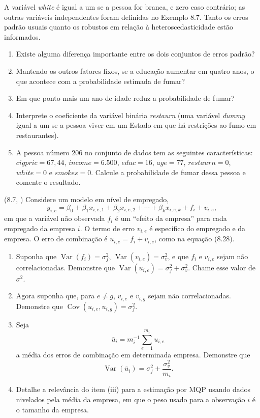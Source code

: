 \documentclass[12pt,letterpaper, onecolumn]{exam}
\begin{document}
\begin{questions}
A variável \textit{white} é igual a um se a pessoa for branca, e zero caso contrário; as outras variáveis independentes foram definidas no Exemplo 8.7. Tanto os erros padrão usuais quanto os robustos em relação à heteroscedasticidade estão informados.

\begin{enumerate}[label=(\roman*)]
    \item Existe alguma diferença importante entre os dois conjuntos de erros padrão?
    \item Mantendo os outros fatores fixos, se a educação aumentar em quatro anos, o que acontece com a probabilidade estimada de fumar?
    \item Em que ponto mais um ano de idade reduz a probabilidade de fumar?
    \item Interprete o coeficiente da variável binária \textit{restaurn} (uma variável \textit{dummy} igual a um se a pessoa viver em um Estado em que há restrições ao fumo em restaurantes).
    \item A pessoa número 206 no conjunto de dados tem as seguintes características: \(cigpric = 67{,}44\), \(income = 6.500\), \(educ = 16\), \(age = 77\), \(restaurn = 0\), \(white = 0\) e \(smokes = 0\). Calcule a probabilidade de fumar dessa pessoa e comente o resultado.
\end{enumerate}

\vspace{0.7cm}

\question (8.7, \citep{wooldridge2016}) Considere um modelo em nível de empregado,
\[
y_{i,e} = \beta_0 + \beta_1 x_{i,e,1} + \beta_2 x_{i,e,2} + \cdots + \beta_k x_{i,e,k} + f_i + v_{i,e},
\]
em que a variável não observada \(f_i\) é um ``efeito da empresa'' para cada empregado da empresa \(i\). O termo de erro \(v_{i,e}\) é específico do empregado e da empresa. O erro de combinação é \(u_{i,e} = f_i + v_{i,e}\), como na equação (8.28).
\begin{enumerate}[label=(\roman*)]
    \item Suponha que \(\operatorname{Var}(f_i)=\sigma_f^2\), \(\operatorname{Var}(v_{i,e})=\sigma_v^2\), e que \(f_i\) e \(v_{i,e}\) sejam não correlacionadas. Demonstre que \(\operatorname{Var}(u_{i,e})=\sigma_f^2+\sigma_v^2\). Chame esse valor de \(\sigma^2\).
    \item Agora suponha que, para \(e \neq g\), \(v_{i,e}\) e \(v_{i,g}\) sejam não correlacionadas. Demonstre que \(\operatorname{Cov}(u_{i,e},u_{i,g})=\sigma_f^2\).
    \item Seja
    \[
    \bar{u}_i = m_i^{-1}\sum_{e=1}^{m_i} u_{i,e}
    \]
    a média dos erros de combinação em determinada empresa. Demonstre que
    \[
    \operatorname{Var}(\bar{u}_i)=\sigma_f^2+\frac{\sigma_v^2}{m_i}.
    \]
    \item Detalhe a relevância do item (iii) para a estimação por MQP usando dados nivelados pela média da empresa, em que o peso usado para a observação \(i\) é o tamanho da empresa.
\end{enumerate}


\end{questions}
\end{document}

